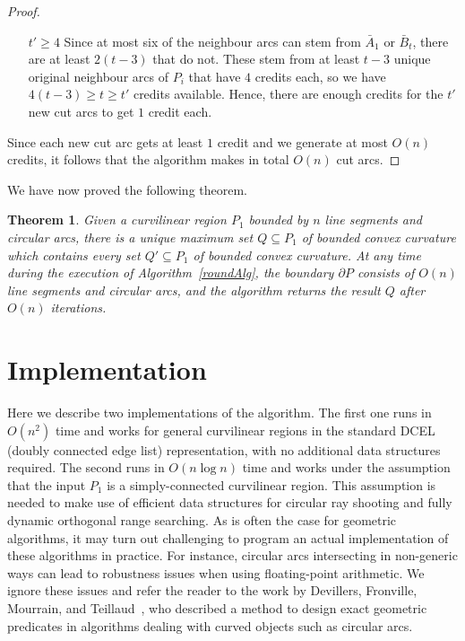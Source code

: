 \documentclass{article}
\newcommand{\PP}{P}
\newcommand{\QQ}{Q}
\newcommand{\arcA}{A}
\newcommand{\arcB}{B}
\newtheorem{theorem}{Theorem}[section]
\begin{document}
\begin{proof}
\begin{itemize}
\item[$t'\geq 4$]
Since at most six of the neighbour arcs can stem from $\bar\arcA_1$ or $\bar\arcB_t$, there are at least $2(t-3)$ that do not.
These stem from at least $t-3$ unique original neighbour arcs of $\PP_i$ that have $4$ credits each, so we have $4(t-3)\geq t\geq t'$ credits available.
Hence, there are enough credits for the $t'$ new cut arcs to get $1$ credit each.
\end{itemize}

Since each new cut arc gets at least $1$ credit and we generate at most $O(n)$ credits, it follows that the algorithm makes in total $O(n)$ cut arcs.
\end{proof}

We have now proved the following theorem.

\begin{theorem}\label{LTThm}
Given a curvilinear region $\PP_1$ bounded by $n$ line segments and circular arcs,
there is a unique maximum set $\QQ\subseteq\PP_1$
of bounded convex curvature
which contains every set $\QQ'\subseteq\PP_1$
of bounded convex curvature.
At any time during the execution of Algorithm~\ref{roundAlg}, the boundary
$\partial\PP$ consists of $O(n)$ line segments and circular arcs, and
the algorithm returns the result $\QQ$ after $O(n)$ iterations.
\end{theorem}

\section{Implementation}\label{anImplementation}

Here we describe two implementations of the algorithm.
The first one runs in $O(n^2)$ time and works for general curvilinear regions in the standard DCEL (doubly connected edge list) representation, with no additional data structures required.
The second runs in $O(n\log n)$ time and works under the assumption that the input $\PP_1$ is a simply-connected curvilinear region.
This assumption is needed to make use of efficient data structures for circular ray shooting and fully dynamic orthogonal range searching.
As is often the case for geometric algorithms, it may turn out challenging to program an actual implementation of these algorithms in practice.
For instance, circular arcs intersecting in non-generic ways can lead to robustness issues when using floating-point arithmetic.
We ignore these issues and refer the reader to the work by Devillers, Fronville, Mourrain, and Teillaud~\cite{DEVILLERS2002119}, who described a method to design exact geometric predicates in algorithms dealing with curved objects such as circular arcs.
\end{document}
